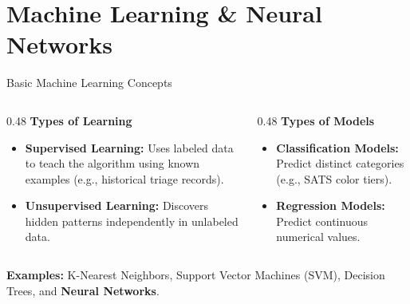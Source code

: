 \documentclass[10pt,aspectratio=169]{beamer}
\begin{document}
	\section{Machine Learning \& Neural Networks}
	\begin{frame}{Basic Machine Learning Concepts}
		\begin{columns}[T]
			\begin{column}{0.48\textwidth}
				\textbf{Types of Learning}
				\begin{itemize}
					\item \textbf{Supervised Learning:} Uses labeled data to teach the algorithm using known examples (e.g., historical triage records).
					\item \textbf{Unsupervised Learning:} Discovers hidden patterns independently in unlabeled data.
				\end{itemize}
			\end{column}
			\begin{column}{0.48\textwidth}
				\textbf{Types of Models}
				\begin{itemize}
					\item \textbf{Classification Models:} Predict distinct categories (e.g., SATS color tiers).
					\item \textbf{Regression Models:} Predict continuous numerical values.
				\end{itemize}
			\end{column}
		\end{columns}
		\vspace{0.5cm}
		\textbf{Examples:} K-Nearest Neighbors, Support Vector Machines (SVM), Decision Trees, and \textbf{Neural Networks}.
	\end{frame}
	
\end{document}
